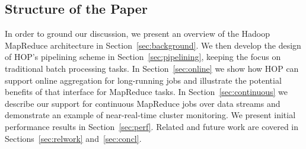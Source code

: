 \subsection{Structure of the Paper}
In order to ground our discussion, we present an overview of the Hadoop
MapReduce architecture in Section~\ref{sec:background}.  We then develop the
design of HOP's pipelining scheme in Section~\ref{sec:pipelining}, keeping the
focus on traditional batch processing tasks.  In Section~\ref{sec:online} we
show how HOP can support online aggregation for long-running jobs and illustrate
the potential benefits of that interface for MapReduce tasks.  In
Section~\ref{sec:continuous} we describe our support for continuous MapReduce
jobs over data streams and demonstrate an example of near-real-time cluster
monitoring.  We present initial performance results in
Section~\ref{sec:perf}. Related and future work are covered in
Sections~\ref{sec:relwork} and~\ref{sec:concl}.
